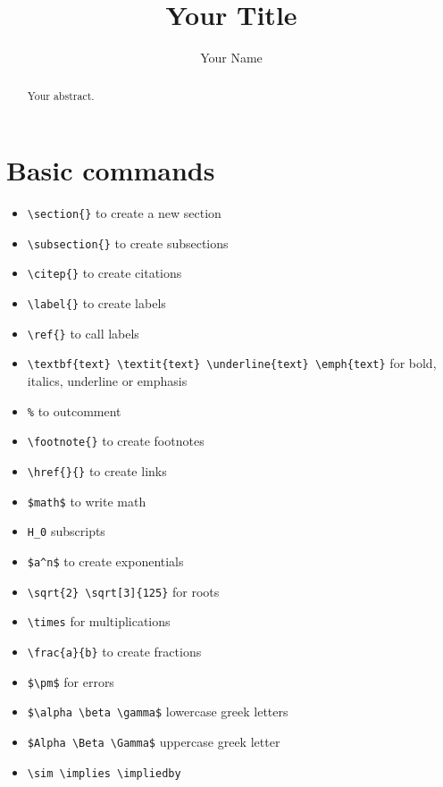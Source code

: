 \documentclass{article}
\title{Your Title}
\author{Your Name}
\begin{document}
\maketitle

\begin{abstract}
Your abstract.
\end{abstract}

\section{Basic commands}
\begin{itemize}
    \item \verb|\section{}| to create a new section
    \item \verb|\subsection{}| to create subsections
    \item \verb|\citep{}| to create citations
    \item \verb|\label{}| to create labels
    \item \verb|\ref{}| to call labels
    \item \verb|\textbf{text} \textit{text} \underline{text} \emph{text}| for bold, italics, underline or emphasis
    \item \verb|%| to outcomment
    \item \verb|\footnote{}| to create footnotes
    \item \verb|\href{}{}| to create links
    \item \verb|$math$| to write math
    \item \verb|H_0| subscripts
    \item \verb|$a^n$| to create exponentials
    \item \verb|\sqrt{2} \sqrt[3]{125}| for roots
    \item \verb|\times| for multiplications
    \item \verb|\frac{a}{b}| to create fractions
    \item \verb|$\pm$| for errors
    \item \verb|$\alpha \beta \gamma$| lowercase greek letters
    \item \verb|$Alpha \Beta \Gamma$| uppercase greek letter
    \item \verb|\sim \implies \impliedby|

\end{itemize}
\end{document}
